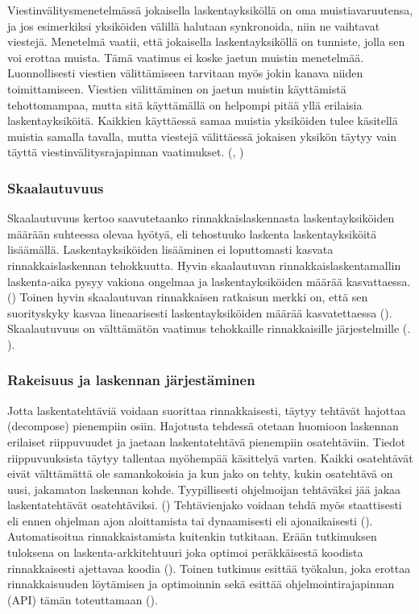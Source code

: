 Viestinvälitysmenetelmässä jokaisella
laskentayksiköllä on oma muistiavaruutensa, ja jos esimerkiksi  yksiköiden
välillä halutaan synkronoida, niin ne vaihtavat viestejä. Menetelmä vaatii,
että jokaisella laskentayksiköllä on tunniste, jolla sen voi erottaa muista.
Tämä vaatimus ei koske jaetun muistin menetelmää. Luonnollisesti viestien
välittämiseen tarvitaan myös jokin kanava niiden toimittamiseen. Viestien
välittäminen on jaetun muistin käyttämistä tehottomampaa, mutta sitä
käyttämällä on helpompi pitää yllä erilaisia laskentayksiköitä. Kaikkien
käyttäessä samaa muistia yksiköiden tulee käsitellä muistia samalla tavalla,
mutta viestejä välittäessä jokaisen yksikön täytyy vain täyttä
viestinvälitysrajapinnan vaatimukset. (\citealt{intro}, \citealt{rauber})

\subsubsection{Skaalautuvuus}

Skaalautuvuus kertoo saavutetaanko rinnakkaislaskennasta laskentayksiköiden määrään
suhteessa olevaa hyötyä, eli tehostuuko laskenta laskentayksiköitä lisäämällä.
Laskentayksiköiden lisääminen ei loputtomasti kasvata rinnakkaislaskennan
tehokkuutta. Hyvin skaalautuvan rinnakkaislaskentamallin laskenta-aika pysyy
vakiona ongelmaa ja laskentayksiköiden määrää kasvattaessa. (\citealt{rauber})
Toinen hyvin skaalautuvan rinnakkaisen ratkaisun merkki on, että sen suorityskyky
kasvaa lineaarisesti laskentayksiköiden määrää kasvatettaessa (\citealt{intro}).
Skaalautuvuus on välttämätön vaatimus tehokkaille rinnakkaisille järjestelmille
(\citealt{intro}. \citealt{rauber}).

\subsubsection{Rakeisuus ja laskennan järjestäminen}

Jotta laskentatehtäviä voidaan suorittaa rinnakkaisesti, täytyy tehtävät
hajottaa (decompose) pienempiin osiin. Hajotusta tehdessä otetaan huomioon laskennan
erilaiset riippuvuudet ja jaetaan laskentatehtävä pienempiin osatehtäviin.
Tiedot riippuvuuksista täytyy tallentaa myöhempää käsittelyä varten.
Kaikki osatehtävät eivät välttämättä ole samankokoisia ja kun jako on tehty,
kukin osatehtävä on uusi, jakamaton laskennan kohde. Tyypillisesti ohjelmoijan
tehtäväksi jää jakaa laskentatehtävät osatehtäviksi. (\citealt{intro})
Tehtävienjako voidaan tehdä myös staattisesti eli ennen ohjelman ajon
aloittamista tai dynaamisesti eli ajonaikaisesti (\citealt{rauber}).
Automatisoitua rinnakkaistamista kuitenkin tutkitaan. Erään tutkimuksen
tuloksena on laskenta-arkkitehtuuri joka optimoi peräkkäisestä koodista
rinnakkaisesti ajettavaa koodia (\citealt{apopei}). Toinen tutkimus esittää
työkalun, joka erottaa rinnakkaisuuden löytämisen ja optimoinnin sekä esittää
ohjelmointirajapinnan (API) tämän toteuttamaan (\citealt{dope}).

